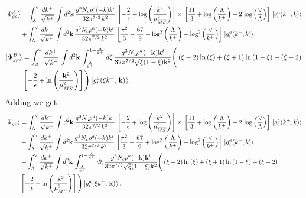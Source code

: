 \documentclass[aps,prd,amsmath,amssymb,nofootinbib]{revtex4-2}
\numberwithin{equation}{section}
\begin{document}
\begin{align}
     \left|\Psi^{A}_{g\rho}\right\rangle & =\int_{\Lambda}^{\vee}\frac{dk^{+}}{\sqrt{k^{+}}}\,\int d^{2}\mathbf{k}\,\frac{g^{3}N_{c}\rho^{a}(-k)k^{i}}{32\pi^{7/2}\,k^{2}}\,\left[-\frac{2}{\epsilon}+\log{\left(\frac{k^{2}}{\mu^{2}_{\overline{MS}}}\right)}\right]\times\, \left[\frac{11}{3}+\log{\left(\frac{\Lambda}{k^{+}}\right)}-2\,\log{\left(\frac{\vee}{\Lambda}\right)}\right]\, \ket{g^{a}_{i}(k^{+},k)}\notag \\ & + \int_{\Lambda}^{\vee}\frac{dk^{+}}{\sqrt{k^{+}}}\,\int d^{2}\mathbf{k}\,\frac{g^{3}N_{c}\rho^{a}(-k)k^{i}}{32\pi^{7/2}\,k^{2}}\, \left[\frac{\pi^{2}}{3} - \frac{67}{9} +\log^{2}\left(\frac{\Lambda}{k^{+}}\right)-\log^{2}\left(\frac{\vee}{k^{+}}\right)\right]\, \ket{g^{a}_{i}(k^{+},k)}
\end{align}
\begin{align}
 \left|\Psi^{B}_{g\rho}\right\rangle & = \int_{\Lambda}^{\vee}\frac{dk^{+}}{\sqrt{k^{+}}}\,\int d^{2}\mathbf{k}\,\int_{\frac{\Lambda}{k^{+}}}^{1-\frac{\Lambda}{k^{+}}}d\xi\,\frac{g^{3}N_{c}\rho^{a}(-\mathbf{k})\mathbf{k}^{i}}{32\pi^{7/2}\sqrt{\xi}(1-\xi)\mathbf{k}^{2}}\Bigg(\left(\xi-2\right)\ln\left(\xi\right)+\left(\xi+1\right)\ln\left(1-\xi\right)-\left(\xi-2\right)\notag \\ & \left[-\frac{2}{\epsilon}+\ln\left(\frac{\mathbf{k}^{2}}{\mu_{\overline{MS}}^{2}}\right)\right]\Bigg)\left|g_{i}^{a}(\xi k^{+},\, \mathbf{k})\right\rangle.
\end{align}
Adding we get
\begin{align}
     \left|\Psi_{g\rho}\right\rangle & =  \int_{\Lambda}^{\vee}\frac{dk^{+}}{\sqrt{k^{+}}}\,\int d^{2}\mathbf{k}\,\frac{g^{3}N_{c}\rho^{a}(-k)k^{i}}{32\pi^{7/2}\,k^{2}}\,\left[-\frac{2}{\epsilon}+\log{\left(\frac{k^{2}}{\mu^{2}_{\overline{MS}}}\right)}\right]\times\, \left[\frac{11}{3}+\log{\left(\frac{\Lambda}{k^{+}}\right)}-2\,\log{\left(\frac{\vee}{\Lambda}\right)}\right]\, \ket{g^{a}_{i}(k^{+},k)}\notag \\ & + \int_{\Lambda}^{\vee}\frac{dk^{+}}{\sqrt{k^{+}}}\,\int d^{2}\mathbf{k}\,\frac{g^{3}N_{c}\rho^{a}(-k)k^{i}}{32\pi^{7/2}\,k^{2}}\, \left[\frac{\pi^{2}}{3} - \frac{67}{9} +\log^{2}\left(\frac{\Lambda}{k^{+}}\right)-\log^{2}\left(\frac{\vee}{k^{+}}\right)\right]\, \ket{g^{a}_{i}(k^{+},k)}\notag \\ & + \int_{\Lambda}^{\vee}\frac{dk^{+}}{\sqrt{k^{+}}}\,\int d^{2}\mathbf{k}\,\int_{\frac{\Lambda}{k^{+}}}^{1-\frac{\Lambda}{k^{+}}}d\xi\,\frac{g^{3}N_{c}\rho^{a}(-\mathbf{k})\mathbf{k}^{i}}{32\pi^{7/2}\sqrt{\xi}(1-\xi)\mathbf{k}^{2}}\Bigg(\left(\xi-2\right)\ln\left(\xi\right)+\left(\xi+1\right)\ln\left(1-\xi\right)-\left(\xi-2\right)\notag \\ & \left[-\frac{2}{\epsilon}+\ln\left(\frac{\mathbf{k}^{2}}{\mu_{\overline{MS}}^{2}}\right)\right]\Bigg)\left|g_{i}^{a}(\xi k^{+},\, \mathbf{k})\right\rangle.
\end{align}
\end{document}
